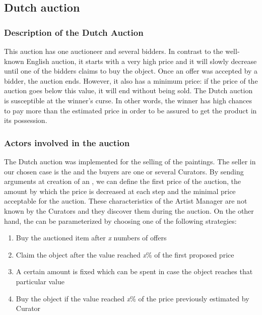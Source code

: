 \documentclass[a4paper,11pt]{article}
\begin{document}
  \subsection{Dutch auction}

  \subsubsection{Description of the Dutch Auction}
  
  This auction has one auctioneer and several bidders. In contrast to the well-known English 
  auction, it starts with a very high price and it will slowly decrease until one of the bidders 
  claims to buy the object. Once an offer was accepted by a bidder, the auction ends. However, 
  it also has a minimum price: if the price of the auction goes below this value, it will end without being 
  sold. The Dutch auction is susceptible at the winner's curse. In other words, the winner has high 
  chances to pay more than the estimated price in order to be assured to get the product in its possession.
  
  \subsubsection{Actors involved in the auction}
  
  The Dutch auction was implemented for the selling of the paintings. The seller in our chosen case 
  is the \am{} and the buyers are one or several Curators. By sending arguments at creation of an 
  \am{}, we can define the first price of the auction, the amount by which the price is decreased 
  at each step and the minimal price acceptable for the auction. These characteristics of the Artist 
  Manager are not known by the Curators and they discover them during the auction. On the other hand,
  the \cu{} can be parameterized by choosing one of the following strategies:
  \begin{enumerate}
   \item Buy the auctioned item after \textit{x} numbers of offers
   \item Claim the object after the value reached \textit{x}\% of the first proposed price
   \item A certain amount is fixed which can be spent in case the object reaches that particular value
   \item Buy the object if the value reached \textit{x}\% of the price previously estimated by Curator
  \end{enumerate}
\end{document}
